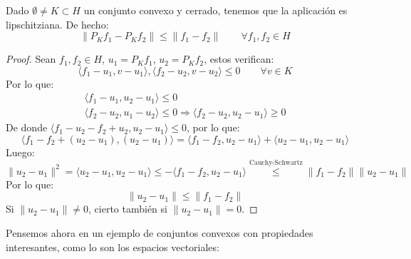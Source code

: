 \begin{prop}
    Dado $\emptyset  \neq K\subset H$ un conjunto convexo y cerrado, tenemos que la aplicación
    es lipschitziana. De hecho:
    \begin{equation*}
        \|P_Kf_1 - P_Kf_2\| \leq \|f_1 - f_2\| \qquad \forall f_1,f_2\in H
    \end{equation*}
    \begin{proof}
        Sean $f_1, f_2\in H$, $u_1 = P_Kf_1$, $u_2=P_Kf_2$, estos verifican:
        \begin{equation*}
            \langle f_1-u_1, v-u_1 \rangle , \langle f_2-u_2,v-u_2 \rangle  \leq 0 \qquad \forall v\in K
        \end{equation*}
        Por lo que:
        \begin{gather*}
            \langle f_1 - u_1, u_2 - u_1 \rangle  \leq 0 \\
            \langle f_2 - u_2, u_1 - u_2 \rangle \leq 0 \Longrightarrow \langle f_2 - u_2, u_2 - u_1 \rangle \geq 0
        \end{gather*}
        De donde $\langle f_1 - u_2 - f_2 + u_2, u_2 - u_1 \rangle \leq 0$, por lo que:
        \begin{equation*}
            \langle f_1 - f_2 + (u_2 - u_1), (u_2 - u_1) \rangle  = \langle f_1 - f_2, u_2 - u_1 \rangle  + \langle u_2 - u_1, u_2 - u_1 \rangle 
        \end{equation*}
        Luego:
        \begin{equation*}
            \|u_2 - u_1\|^2 = \langle u_2 - u_1, u_2 - u_1 \rangle  \leq - \langle f_1 - f_2, u_2 - u_1 \rangle \stackrel{\text{Cauchy-Schwartz}}{\leq} \|f_1 - f_2\| \|u_2 - u_1\|
        \end{equation*}
        Por lo que:
        \begin{equation*}
            \|u_2 - u_1\| \leq \|f_1 - f_2\|
        \end{equation*}
        Si $\|u_2 - u_1\| \neq 0$, cierto también si $\|u_2 - u_1\| = 0$.
    \end{proof}
\end{prop}

\noindent
Pensemos ahora en un ejemplo de conjuntos convexos con propiedades interesantes, como lo son los espacios vectoriales:

